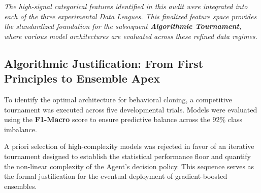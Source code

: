 \vspace{0.2cm}
\noindent \textit{The high-signal categorical features identified in this audit were integrated into each of the three experimental Data Leagues. This finalized feature space provides the standardized foundation for the subsequent \textbf{Algorithmic Tournament}, where various model architectures are evaluated across these refined data regimes.}


\subsection{Algorithmic Justification: From First Principles to Ensemble Apex}
To identify the optimal architecture for behavioral cloning, a competitive tournament was executed across five developmental trials. Models were evaluated using the \textbf{F1-Macro} score to ensure predictive balance across the 92\% class imbalance.

A priori selection of high-complexity models was rejected in favor of an iterative tournament designed to establish the statistical performance floor and quantify the non-linear complexity of the Agent’s decision policy. This sequence serves as the formal justification for the eventual deployment of gradient-boosted ensembles.

